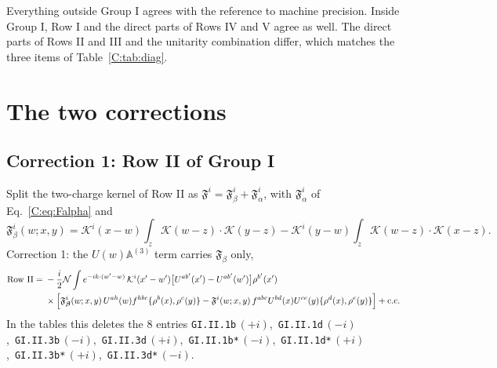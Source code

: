 \documentclass[10pt]{article}
\numberwithin{equation}{section}
\newcommand{\KK}{\mathcal K}
\newcommand{\NN}{\mathcal N}
\newcommand{\lab}[1]{\texttt{#1}}
\begin{document}
Everything outside Group I agrees with the reference to machine precision. Inside Group I, Row I and the direct parts of Rows IV and V agree as well. The direct parts of Rows II and III and the unitarity combination differ, which matches the three items of Table~\ref{C:tab:diag}.


\section{The two corrections}\label{C:sec:corrections}

\subsection{Correction 1: Row II of Group I}
Split the two-charge kernel of Row II as $\mathfrak F^i=\mathfrak F^i_\beta+\mathfrak F^i_\alpha$, with $\mathfrak F^i_\alpha$ of Eq.~\eqref{C:eq:Falpha} and
\begin{equation}
\mathfrak F^i_\beta(w;x,y)=\KK^i(x-w)\int_z\KK(w-z)\cdot\KK(y-z)-\KK^i(y-w)\int_z\KK(w-z)\cdot\KK(x-z).
\end{equation}
Correction 1: the $U(w)\mathbb A^{(3)}$ term carries $\mathfrak F_\beta$ only,
\begin{align}
\text{Row II}={}&-\frac i2\NN\int e^{-ik\cdot(w'-w)}\,\KK^i(x'-w')\big[U^{ab'}(x')-U^{ab'}(w')\big]\rho^{b'}(x')\notag\\
&\times\Big[\mathfrak F^i_{\boldsymbol\beta}(w;x,y)\,U^{ah}(w)f^{hbc}\{\rho^b(x),\rho^c(y)\}-\mathfrak F^i(w;x,y)\,f^{abc}U^{bd}(x)U^{ce}(y)\{\rho^d(x),\rho^e(y)\}\Big]+{\rm c.c.}
\label{C:eq:RowIIcorr}
\end{align}
In the tables this deletes the 8 entries \lab{GI.II.1b}\,$(+i)$,\ \lab{GI.II.1d}\,$(-i)$,\ \lab{GI.II.3b}\,$(-i)$,\ \lab{GI.II.3d}\,$(+i)$,\ \lab{GI.II.1b*}\,$(-i)$,\ \lab{GI.II.1d*}\,$(+i)$,\ \lab{GI.II.3b*}\,$(+i)$,\ \lab{GI.II.3d*}\,$(-i)$.
\end{document}
